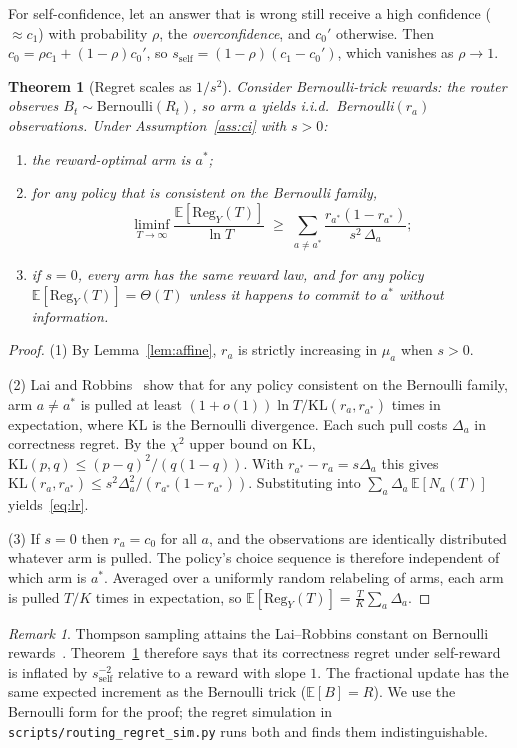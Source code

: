 \documentclass[conference]{IEEEtran}
\newtheorem{theorem}{Theorem}
\theoremstyle{definition}
\theoremstyle{remark}
\newtheorem{remark}{Remark}
\newcommand{\E}{\mathbb{E}}
\newcommand{\KL}{\mathrm{KL}}
\begin{document}
For self-confidence, let an answer that is wrong still receive a high confidence ($\approx c_1$) with probability $\rho$, the \emph{overconfidence}, and $c_0'$ otherwise. Then $c_0=\rho c_1+(1-\rho)c_0'$, so $s_{\text{self}}=(1-\rho)(c_1-c_0')$, which vanishes as $\rho\to1$.

\begin{theorem}[Regret scales as $1/s^2$]\label{thm:regret}
Consider Bernoulli-trick rewards: the router observes $B_t\sim\mathrm{Bernoulli}(R_t)$, so arm $a$ yields i.i.d.\ Bernoulli$(r_a)$ observations. Under Assumption~\ref{ass:ci} with $s>0$:
\begin{enumerate}
\item the reward-optimal arm is $a^*$;
\item for any policy that is consistent on the Bernoulli family,
\begin{equation}
\liminf_{T\to\infty}\frac{\E[\mathrm{Reg}_Y(T)]}{\ln T}\;\ge\;\sum_{a\neq a^*}\frac{r_{a^*}(1-r_{a^*})}{s^2\,\Delta_a};\label{eq:lr}
\end{equation}
\item if $s=0$, every arm has the same reward law, and for any policy $\E[\mathrm{Reg}_Y(T)]=\Theta(T)$ unless it happens to commit to $a^*$ without information.
\end{enumerate}
\end{theorem}
\begin{proof}
(1) By Lemma~\ref{lem:affine}, $r_a$ is strictly increasing in $\mu_a$ when $s>0$.

(2) Lai and Robbins~\cite{lai1985} show that for any policy consistent on the Bernoulli family, arm $a\ne a^*$ is pulled at least $(1+o(1))\ln T/\KL(r_a,r_{a^*})$ times in expectation, where $\KL$ is the Bernoulli divergence. Each such pull costs $\Delta_a$ in correctness regret. By the $\chi^2$ upper bound on KL, $\KL(p,q)\le (p-q)^2/(q(1-q))$. With $r_{a^*}-r_a=s\Delta_a$ this gives $\KL(r_a,r_{a^*})\le s^2\Delta_a^2/(r_{a^*}(1-r_{a^*}))$. Substituting into $\sum_a\Delta_a\,\E[N_a(T)]$ yields~\eqref{eq:lr}.

(3) If $s=0$ then $r_a=c_0$ for all $a$, and the observations are identically distributed whatever arm is pulled. The policy's choice sequence is therefore independent of which arm is $a^*$. Averaged over a uniformly random relabeling of arms, each arm is pulled $T/K$ times in expectation, so $\E[\mathrm{Reg}_Y(T)]=\frac{T}{K}\sum_a\Delta_a$.
\end{proof}

\begin{remark}
Thompson sampling attains the Lai--Robbins constant on Bernoulli rewards~\cite{agrawal2012,kaufmann2012}. Theorem~\ref{thm:regret} therefore says that its correctness regret under self-reward is inflated by $s_{\text{self}}^{-2}$ relative to a reward with slope $1$. The fractional update has the same expected increment as the Bernoulli trick ($\E[B]=R$). We use the Bernoulli form for the proof; the regret simulation in \texttt{scripts/routing\_regret\_sim.py} runs both and finds them indistinguishable.
\end{remark}
\end{document}
